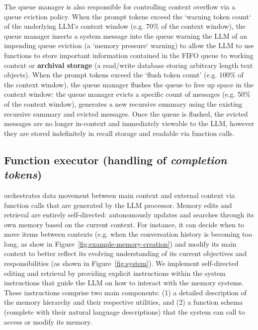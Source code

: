The queue manager is also responsible for controlling context overflow via a queue eviction policy. When the prompt tokens exceed the `warning token count` of the underlying LLM's context window (e.g. 70\% of the context window), the queue manager inserts a system message into the queue warning the LLM of an impending queue eviction (a `memory pressure` warning) to allow the LLM to use \ours functions to store important information contained in the FIFO queue to working context or \textbf{archival storage} (a read/write database storing arbitrary length text objects). When the prompt tokens exceed the `flush token count' (e.g. 100\% of the context window), the queue manager flushes the queue to free up space in the context window: the queue manager evicts a specific count of messages (e.g. 50\% of the context window), generates a new recursive summary using the existing recursive summary and evicted messages. Once the queue is flushed, the evicted messages are no longer in-context and immediately viewable to the LLM, however they are stored indefinitely in recall storage and readable via \ours function calls.

\subsection{Function executor (handling of \emph{completion tokens})}

\ours orchestrates data movement between main context and external context via function calls that are generated by the LLM processor.
Memory edits and retrieval are entirely self-directed: \ours autonomously updates and searches through its own memory based on the current context. 
For instance,
it can
decide when to move items between contexts (e.g. when the conversation history is becoming too long, as show in Figure~\ref{fig:example-memory-creation}) and modify its main context to better reflect its evolving understanding of its current objectives and responsibilities (as shown in Figure~\ref{fig:system}).
We implement self-directed editing and retrieval by providing explicit instructions within the system instructions that guide the LLM on how to interact with the \ours memory systems. These instructions comprise two main components: (1) a detailed description of the memory hierarchy and their respective utilities, and (2) a function schema (complete with their natural language descriptions) that the system can call to access or modify its memory.











